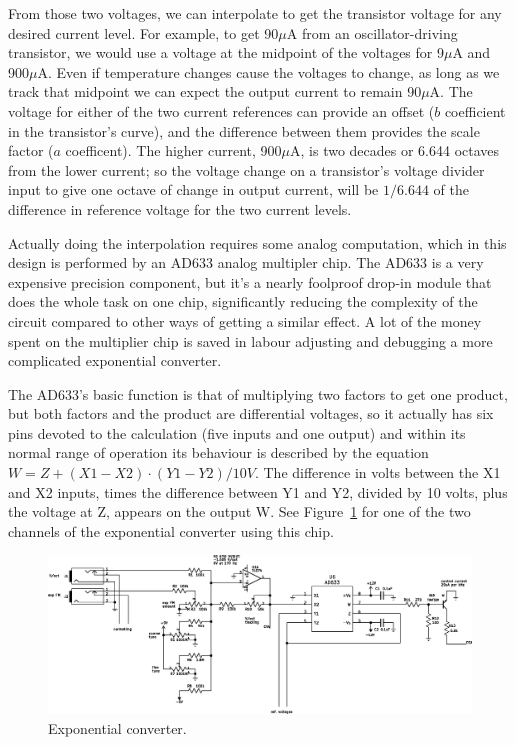 From those two voltages, we can interpolate to get the transistor voltage
for any desired current level.  For example, to get 90$\mu$A from an
oscillator-driving transistor, we would use a voltage at the midpoint of the
voltages for 9$\mu$A and 900$\mu$A.  Even if temperature changes cause the
voltages to change, as long as we track that midpoint we can expect the
output current to remain 90$\mu$A.  The voltage for either of the two
current references can provide an offset ($b$ coefficient in the
transistor's curve), and the difference between them provides the scale
factor ($a$ coefficent).  The higher current, 900$\mu$A, is two decades or
6.644 octaves from the lower current; so the voltage change on a
transistor's voltage divider input to give one octave of change in output
current, will be $1/6.644$ of the difference in reference voltage for the
two current levels.

Actually doing the interpolation requires some analog computation, which in
this design is performed by an AD633 analog multipler chip.  The AD633 is a
very expensive precision component, but it's a nearly foolproof drop-in
module that does the whole task on one chip, significantly reducing the
complexity of the circuit compared to other ways of getting a similar
effect.  A lot of the money spent on the multiplier chip is saved in labour
adjusting and debugging a more complicated exponential converter.

The AD633's basic function is that of multiplying two factors to get one
product, but both factors and the product are differential voltages, so it
actually has six pins devoted to the calculation (five inputs and one
output) and within its normal range of operation its behaviour is described
by the equation $W=Z+(X1-X2)\cdot(Y1-Y2)/10V$.  The difference in volts
between the X1 and X2 inputs, times the difference between Y1 and Y2,
divided by 10 volts, plus the voltage at Z, appears on the output W.  See
Figure~\ref{fig:expo-con} for one of the two channels of the exponential
converter using this chip.

\begin{figure}
\centering\includegraphics[width=\linewidth]{expo-con}\par
\caption{Exponential converter.}\label{fig:expo-con}
\end{figure}

